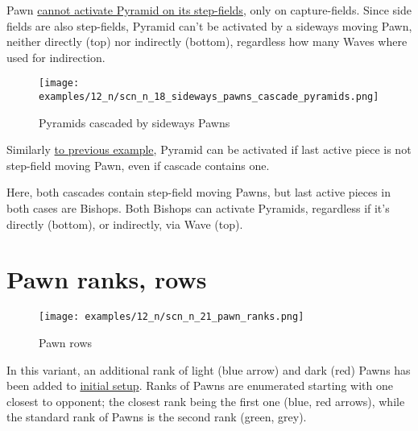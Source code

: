 Pawn
\hyperref[fig:scn_mv_35_activating_pyramid_by_pawn]{cannot activate Pyramid on its step-fields},
only on capture-fields.
Since side fields are also step-fields, Pyramid can't be activated by a sideways
moving Pawn, neither directly (top) nor indirectly (bottom), regardless how many
Waves where used for indirection.

\clearpage %

\vspace*{-2.1\baselineskip}
\noindent
\begin{figure}[!h]
\texttt{[image: examples/12\_n/scn\_n\_18\_sideways\_pawns\_cascade\_pyramids.png]}
\caption{Pyramids cascaded by sideways Pawns}
\label{fig:scn_n_18_sideways_pawns_cascade_pyramids}
\end{figure}

Similarly
\hyperref[fig:scn_mv_36_activating_pyramid_cascade_pawn]{to previous example},
Pyramid can be activated if last active piece is not step-field moving Pawn, even
if cascade contains one.

Here, both cascades contain step-field moving Pawns, but last active pieces in both
cases are Bishops. Both Bishops can activate Pyramids, regardless if it's directly
(bottom), or indirectly, via Wave (top).

\clearpage %

\section*{Pawn ranks, rows}
\label{sec:Nineteen/Pawn ranks, rows}

\vspace*{-1.1\baselineskip}
\noindent
\begin{figure}[!h]
\texttt{[image: examples/12\_n/scn\_n\_21\_pawn\_ranks.png]}
\caption{Pawn rows}
\label{fig:scn_n_21_pawn_ranks}
\end{figure}

In this variant, an additional rank of light (blue arrow) and dark (red) Pawns has
been added to \hyperref[fig:12_nineteen]{initial setup}. Ranks of Pawns are enumerated
starting with one closest to opponent; the closest rank being the first one (blue,
red arrows), while the standard rank of Pawns is the second rank (green, grey).

